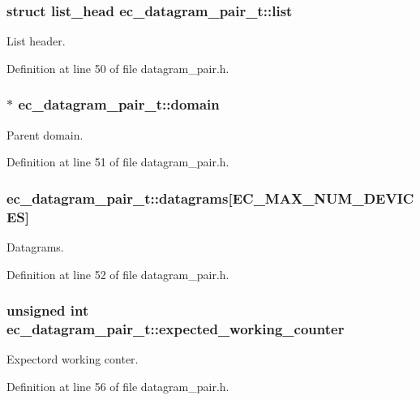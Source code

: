 \subsubsection[{list}]{\setlength{\rightskip}{0pt plus 5cm}struct list\-\_\-head {\bf ec\-\_\-datagram\-\_\-pair\-\_\-t\-::list}}\label{structec__datagram__pair__t_a8b2eafeceb6565bfe2d0c2363679ba1e}


\-List header. 



\-Definition at line 50 of file datagram\-\_\-pair.\-h.

\subsubsection[{domain}]{$\ast$ {\bf ec\-\_\-datagram\-\_\-pair\-\_\-t\-::domain}}\label{structec__datagram__pair__t_aaaa75d1c846028cdd78be790c82a9e31}


\-Parent domain. 



\-Definition at line 51 of file datagram\-\_\-pair.\-h.

\subsubsection[{datagrams}]{ {\bf ec\-\_\-datagram\-\_\-pair\-\_\-t\-::datagrams}[\-E\-C\-\_\-\-M\-A\-X\-\_\-\-N\-U\-M\-\_\-\-D\-E\-V\-I\-C\-E\-S]}\label{structec__datagram__pair__t_a3984a280ea726795e9402bc7363d05ed}


\-Datagrams. 



\-Definition at line 52 of file datagram\-\_\-pair.\-h.

\subsubsection[{expected\-\_\-working\-\_\-counter}]{\setlength{\rightskip}{0pt plus 5cm}unsigned int {\bf ec\-\_\-datagram\-\_\-pair\-\_\-t\-::expected\-\_\-working\-\_\-counter}}\label{structec__datagram__pair__t_aa6e12e670f12a511f108b9cd7974f1ce}


\-Expectord working conter. 



\-Definition at line 56 of file datagram\-\_\-pair.\-h.

